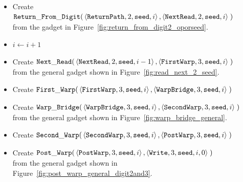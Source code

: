 \begin{itemize}
    \item Create
    $\begin{aligned}[t]
        {\tt Return\_From\_Digit}(&\left\langle {\tt ReturnPath},    2, {\tt seed}, i \right\rangle,
                          \left\langle {\tt NextRead}, 2, {\tt seed}, i \right\rangle \;)
    \end{aligned}$\\ from the gadget in Figure~\ref{fig:return_from_digit2_oporseed}.


    \item $i \gets i + 1$

    \item Create
    $\begin{aligned}[t]
        {\tt Next\_Read}(&\left\langle {\tt NextRead},  2, {\tt seed}, i - 1 \right\rangle,
                   \left\langle {\tt FirstWarp}, 3, {\tt seed}, i     \right\rangle \;)
    \end{aligned}$\\ from the general gadget shown in Figure~\ref{fig:read_next_2_seed}.

    \item Create
    $\begin{aligned}[t]
        {\tt First\_Warp}(&\left\langle {\tt FirstWarp},  3, {\tt seed}, i \right\rangle,
                    \left\langle {\tt WarpBridge}, 3, {\tt seed}, i \right\rangle \;)
    \end{aligned}$

    \item Create
    $\begin{aligned}[t]
        {\tt Warp\_Bridge}(&\left\langle {\tt WarpBridge}, 3, {\tt seed}, i \right\rangle,
                     \left\langle {\tt SecondWarp}, 3, {\tt seed}, i \right\rangle \;)
    \end{aligned}$\\ from the general gadget shown in Figure~\ref{fig:warp_bridge_general}.

    \item Create
    $\begin{aligned}[t]
        {\tt Second\_Warp}(&\left\langle {\tt SecondWarp}, 3, {\tt seed}, i  \right\rangle,
                     \left\langle {\tt PostWarp},   3, {\tt seed}, i  \right\rangle \;)
    \end{aligned}$

    \item Create
    $\begin{aligned}[t]
        {\tt Post\_Warp}(&\left\langle {\tt PostWarp}, 3, {\tt seed}, i    \right\rangle,
                   \left\langle {\tt Write},    3, {\tt seed}, i, 0 \right\rangle \;)
    \end{aligned}$\\from the general gadget shown in Figure~\ref{fig:post_warp_general_digit2and3}.



\end{itemize}
